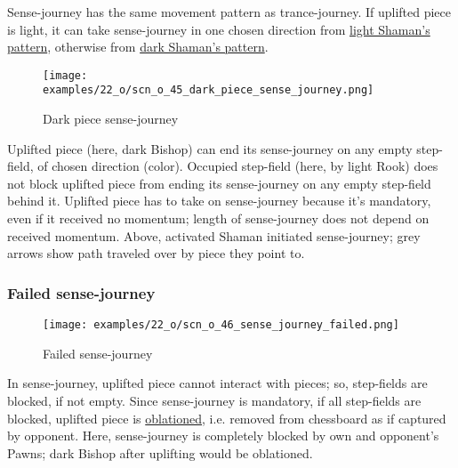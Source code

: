 Sense-journey has the same movement pattern as trance-journey. If uplifted piece
is light, it can take sense-journey in one chosen direction from
\hyperref[fig:scn_cot_082_light_shaman_trance_journey]{light Shaman's pattern},
otherwise from
\hyperref[fig:scn_cot_084_dark_shaman_trance_journey]{dark Shaman's pattern}.

\clearpage %

\vspace*{-2.1\baselineskip}
\noindent
\begin{figure}[!h]
\texttt{[image: examples/22\_o/scn\_o\_45\_dark\_piece\_sense\_journey.png]}
\vspace*{-1.4\baselineskip}
\caption{Dark piece sense-journey}
\label{fig:scn_o_45_dark_piece_sense_journey}
\end{figure}

\vspace*{-0.5\baselineskip}
Uplifted piece (here, dark Bishop) can end its sense-journey on any empty step-field,
of chosen direction (color). Occupied step-field (here, by light Rook) does not block
uplifted piece from ending its sense-journey on any empty step-field behind it.
Uplifted piece has to take on sense-journey because it's mandatory, even if it received
no momentum; length of sense-journey does not depend on received momentum. Above,
activated Shaman initiated sense-journey; grey arrows show path traveled over by
piece they point to.

\clearpage %

\subsubsection*{Failed sense-journey}
\label{sec:One/Starchild/Sense-journey/Failed sense-journey}

\vspace*{-1.4\baselineskip}
\noindent
\begin{figure}[!h]
\texttt{[image: examples/22\_o/scn\_o\_46\_sense\_journey\_failed.png]}
\vspace*{-1.4\baselineskip}
\caption{Failed sense-journey}
\label{fig:scn_o_46_sense_journey_failed}
\end{figure}

\vspace*{-0.5\baselineskip}
In sense-journey, uplifted piece cannot interact with pieces; so, step-fields are
blocked, if not empty. Since sense-journey is mandatory, if all step-fields are
blocked, uplifted piece is \hyperref[sec:Terms/Oblation]{oblationed}, i.e. removed
from chessboard as if captured by opponent. \newline
\indent
Here, sense-journey is completely blocked by own and opponent's Pawns; dark Bishop
after uplifting would be oblationed.

